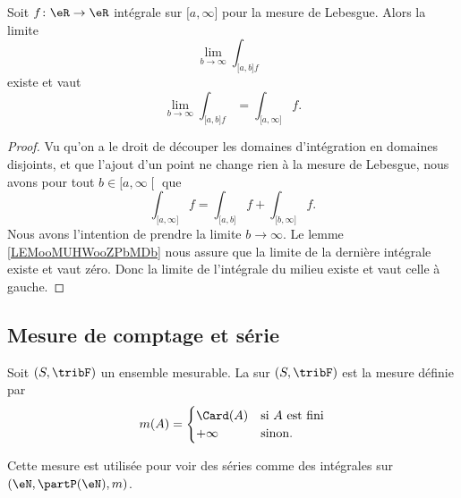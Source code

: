 \begin{lemma}        \label{LEMooKGZDooWiKiHR}
    Soit \( f\colon \eR\to \eR\) intégrale sur \( \mathopen[ a , \infty \mathclose]\) pour la mesure de Lebesgue. Alors la limite 
    \begin{equation}
        \lim_{b\to \infty}\int_{\mathopen[ a , b \mathclose]f} 
    \end{equation}
    existe et vaut
    \begin{equation}
        \lim_{b\to \infty}\int_{\mathopen[ a , b \mathclose]f} =\int_{\mathopen[ a , \infty \mathclose]}f.
    \end{equation}
\end{lemma}

\begin{proof}
    Vu qu'on a le droit de découper les domaines d'intégration en domaines disjoints, et que l'ajout d'un point ne change rien à la mesure de Lebesgue, nous avons pour tout \( b\in \mathopen[ a , \infty \mathclose[\) que
            \begin{equation}
                \int_{\mathopen[ a , \infty \mathclose]}f=\int_{\mathopen[ a , b \mathclose]}f+\int_{\mathopen[ b , \infty \mathclose]}f.
            \end{equation}
            Nous avons l'intention de prendre la limite \( b\to \infty\).  Le lemme \ref{LEMooMUHWooZPbMDb} nous assure que la limite de la dernière intégrale existe et vaut zéro. Donc la limite de l'intégrale du milieu existe et vaut celle à gauche.
\end{proof}

\subsection{Mesure de comptage et série}

\begin{definition}      \label{DEFooILJRooByDzhs}
	Soit \( (S,\tribF)\) un ensemble mesurable. La  sur \( (S,\tribF)\) est la mesure définie par
	\begin{equation}
		m(A)=\begin{cases}
			\Card(A) & \text{si } A\text{ est fini} \\
			+\infty  & \text{sinon}.
		\end{cases}
	\end{equation}
\end{definition}
Cette mesure est utilisée pour voir des séries comme des intégrales sur \( (\eN,\partP(\eN),m)\).

